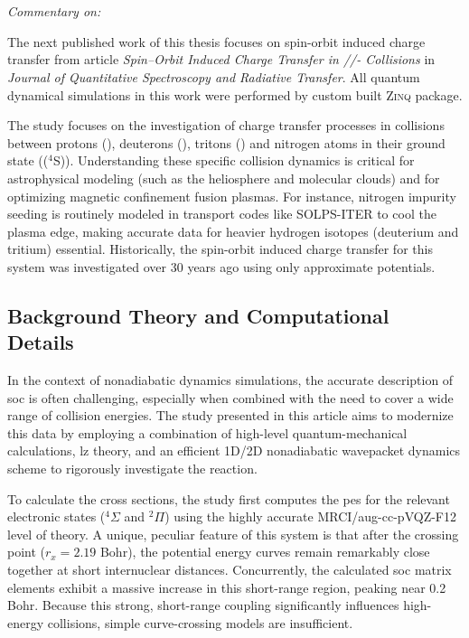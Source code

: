\section{\filetotitle}\label{sec:spin_orbit_induced_charge_transfer}
\textit{Commentary on: }

The next published work of this thesis focuses on spin-orbit induced charge transfer from article \textit{Spin--Orbit Induced Charge Transfer in //- Collisions} in \textit{Journal of Quantitative Spectroscopy and Radiative Transfer}. All quantum dynamical simulations in this work were performed by custom built \textsc{Zinq} package.\supercite{10.5281/zenodo.18386143}

The study focuses on the investigation of charge transfer processes in collisions between protons (), deuterons (), tritons () and nitrogen atoms in their ground state (($^4$S)). Understanding these specific collision dynamics is critical for astrophysical modeling (such as the heliosphere and molecular clouds) and for optimizing magnetic confinement fusion plasmas. For instance, nitrogen impurity seeding is routinely modeled in transport codes like SOLPS-ITER to cool the plasma edge, making accurate data for heavier hydrogen isotopes (deuterium and tritium) essential. Historically, the spin-orbit induced charge transfer for this system was investigated over 30 years ago using only approximate potentials.
\subsection{Background Theory and Computational Details}
In the context of nonadiabatic dynamics simulations, the accurate description of \acrfull{soc} is often challenging, especially when combined with the need to cover a wide range of collision energies. The study presented in this article aims to modernize this data by employing a combination of high-level quantum-mechanical calculations, \acrfull{lz} theory, and an efficient 1D/2D nonadiabatic wavepacket dynamics scheme to rigorously investigate the  reaction.

To calculate the cross sections, the study first computes the \acrshort{pes} for the relevant electronic states ($^4\Sigma$ and $^2\Pi$) using the highly accurate MRCI/aug-cc-pVQZ-F12 level of theory. A unique, peculiar feature of this system is that after the crossing point ($r_x=2.19$ Bohr), the potential energy curves remain remarkably close together at short internuclear distances. Concurrently, the calculated \acrshort{soc} matrix elements exhibit a massive increase in this short-range region, peaking near 0.2 Bohr. Because this strong, short-range coupling significantly influences high-energy collisions, simple curve-crossing models are insufficient.

